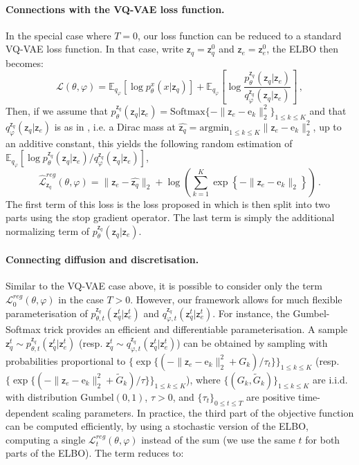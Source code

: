 \documentclass{article}
\theoremstyle{plain}
\theoremstyle{definition}
\theoremstyle{remark}
\newcommand{\latentcont}{\mathsf{z}_e}
\newcommand{\latentdis}{\mathsf{z}_q}
\newcommand{\rme}{\mathrm{e}}
\newcommand{\embed}{\rme}
\begin{document}
\paragraph{Connections with the VQ-VAE loss function. } In the special case where $T=0$, our loss function can be reduced to a standard VQ-VAE loss function. In that case, write $\latentdis = \latentdis^0$ and $\latentcont = \latentcont^0$, the ELBO then becomes: 
$$
\mathcal{L}(\theta,\varphi) = \mathbb{E}_{q_{\varphi}}\left[\log p^x_{\theta}(x|\latentdis)\right]
+ \mathbb{E}_{q_{\varphi}}\left[\log \frac{p_{\theta}^{\latentdis}(\latentdis|\latentcont)}{q_{\varphi}^{\latentdis}(\latentdis|\latentcont)}\right]\,, 
$$
Then, if we assume that $p_{\theta}^{\latentdis}(\latentdis|\latentcont) = \mathrm{Softmax}\{-\|\latentcont - \embed_k\|^2_2\}_{1\leq k \leq K}$ and that  $q_{\varphi}^{\latentdis}(\latentdis|\latentcont)$ is as in \cite{oord2017neural}, i.e. a Dirac mass at $\widehat{\latentdis} = \mathrm{argmin}_{1\leq k \leq K}\|\latentcont - \embed_k\|^2_2$, up to an additive constant, this yields the following random estimation of $\mathbb{E}_{q_{\varphi}}[\log p_{\theta}^{\latentdis}(\latentdis|\latentcont)/q_{\varphi}^{\latentdis}(\latentdis|\latentcont)]$,
$$
    \widehat{\mathcal{L}}^{reg}_{\latentdis}(\theta,\varphi) = \|\latentcont - \widehat{\latentdis}\|_2 + \log \left(\sum_{k=1}^{K}\exp\left\{-\|\latentcont-\embed_k\|_2\right\}\right)\,.
$$
The first term of this loss is the loss proposed in \cite{oord2017neural} which is then split into two parts using the stop gradient operator. The last term is simply the additional normalizing term of  $p_{\theta}^{\latentdis}(\latentdis|\latentcont)$. 

\paragraph{Connecting diffusion and discretisation. } Similar to the VQ-VAE case above, it is possible to consider only the term $\mathcal{L}^{reg}_0(\theta,\varphi)$ in the case $T > 0$. However, our framework allows for much flexible parameterisation of $p_{\theta,t}^{\latentdis}(\latentdis^t|\latentcont^t)$ and $q_{\varphi,t}^{\latentdis}(\latentdis^t|\latentcont^t)$. For instance, the Gumbel-Softmax trick provides an efficient and differentiable parameterisation. A sample $\latentdis^t\sim  p_{\theta,t}^{\latentdis}(\latentdis^t|\latentcont^t)$ (resp. $\latentdis^t\sim q_{\varphi,t}^{\latentdis}(\latentdis^t|\latentcont^t)$) can be obtained by sampling with probabilities proportional to $\{\exp\{(-\|\latentcont - \embed_k\|^2_2 + G_k )/\tau_t\}\}_{1\leq k \leq K}$ (resp. $\{\exp\{(-\|\latentcont - \embed_k\|^2_2 + \tilde G_k )/\tau\}\}_{1\leq k \leq K}$), where $\{(G_k,\tilde G_k)\}_{1\leq k \leq K}$ are i.i.d. with distribution $\mathrm{Gumbel}(0,1)$, $\tau>0$, and $\{\tau_t\}_{0\leq t \leq T}$ are positive  time-dependent scaling parameters. In practice, the third part of the objective function can be computed efficiently, by using a stochastic version of the ELBO, computing a single $\mathcal{L}^{reg}_t(\theta,\varphi)$ instead of the sum (we use the same $t$ for both parts of the ELBO). The term reduces to:
\end{document}

